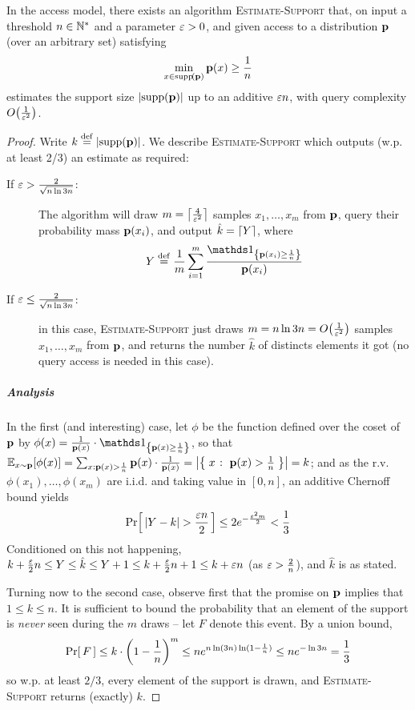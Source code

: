 \begin{theorem}\label{theorem:support:estimation:additive:extended:access}
In the \pdfsamp access model, there exists an algorithm \textsc{Estimate-Support} that, on input a threshold $n\in\mathbb{N}^\ast$ and a parameter $\varepsilon > 0$, and given access to a distribution $\mathbf{p}$ (over an arbitrary set) satisfying 
\[ \min_{x\in\operatorname{supp}\!\left(\mathbf{p}\right)} \mathbf{p}(x) \geq \frac{1}{n} \]
estimates the support size $\left\lvert \operatorname{supp}\!\left(\mathbf{p}\right) \right\rvert$ up to an additive $\varepsilon n$, with query complexity $\bigO{\frac{1}{\eps^2}}$.
\end{theorem}
\begin{proof}
  Write $k\stackrel{\rm def}{=} \left\lvert \operatorname{supp}\!\left(\mathbf{p}\right) \right\rvert$. We describe \textsc{Estimate-Support} which outputs (w.p. at least 2/3) an estimate as required:
  \begin{description}
    \item[If $\varepsilon > \frac{2}{\sqrt{n\ln 3n}}$:]
The algorithm will draw $m=\left\lceil \frac{4}{\varepsilon^2} \right\rceil$ samples $x_1,\dots, x_m$ from $\mathbf{p}$, query their probability mass $\mathbf{p}(x_i)$, and output $\hat{k}=\left\lceil Y \right\rceil$, where
  \[
    Y \eqdef \frac{1}{m}\sum_{i=1}^m \frac{\indic{\D(x_i) \geq \frac{1}{n} }}{\D(x_i)}
  \]
    \item[If $\varepsilon \leq \frac{2}{\sqrt{n\ln 3n}}$:] in this case, \textsc{Estimate-Support} just draws $m=n\ln 3n=\bigO{\frac{1}{\eps^2}}$ samples $x_1,\dots, x_m$ from $\mathbf{p}$, and returns the number $\hat{k}$ of distincts elements it got (no query access is needed in this case).
  \end{description}

\subparagraph{Analysis} In the first (and interesting) case, let $\phi$ be the function defined over the coset of $\mathbf{p}$ by $\phi(x)=\frac{1}{\D(x)}\cdot\indic{\D(x) \geq \frac{1}{n} }$, so that $\mathbb{E}_{x\sim\mathbf{p}}[ \phi(x) ] = \sum_{x: \mathbf{p}(x) > \frac{1}{n}} \mathbf{p}(x)\cdot\frac{1}{\mathbf{p}(x)} = \left\lvert \left\{\; x \;\colon\; \mathbf{p}(x) > \frac{1}{n}\; \right\} \right\rvert=k$; and as the r.v. $\phi(x_1),\dots, \phi(x_m)$ are i.i.d. and taking value in $[0,n]$, an additive Chernoff bound yields
\[
  \Pr\!\left[\,  \left\lvert Y - k  \right\rvert  > \frac{\varepsilon n}{2} \, \right] \leq 2e^{-\frac{\varepsilon^2 m}{2}} < \frac{1}{3}
\]
Conditioned on this not happening, $k + \frac{\varepsilon}{2}n \leq Y \leq \hat{k}\leq Y + 1 \leq k + \frac{\varepsilon}{2}n + 1 \leq k + \varepsilon n$ (as $\varepsilon > \frac{2}{n}$), and $\hat{k}$ is as stated.

Turning now to the second case, observe first that the promise on $\mathbf{p}$ implies that $1 \leq k \leq n$. It is sufficient to bound the probability that an element of the support is \emph{never} seen during the $m$ draws -- let $F$ denote this event. By a union bound,
\[
  \Pr\!\left[\,  F \, \right] \leq k\cdot\left(1-\frac{1}{n}\right)^m \leq n e^{n\ln (3n)\ln(1-\frac{1}{n})} \leq n e^{-\ln 3n} = \frac{1}{3} 
\]
so w.p. at least $2/3$, every element of the support is drawn, and \textsc{Estimate-Support} returns (exactly) $k$.
\end{proof}


